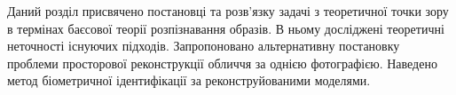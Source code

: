 Даний розділ присвячено постановці та розв'язку задачі з теоретичної точки зору
в термінах баєсової теорії розпізнавання образів.
В ньому досліджені теоретичні неточності існуючих підходів.
Запропоновано альтернативну постановку проблеми
просторової реконструкції обличчя за однією фотографією.
Наведено метод біометричної ідентифікації за реконструйованими моделями.
